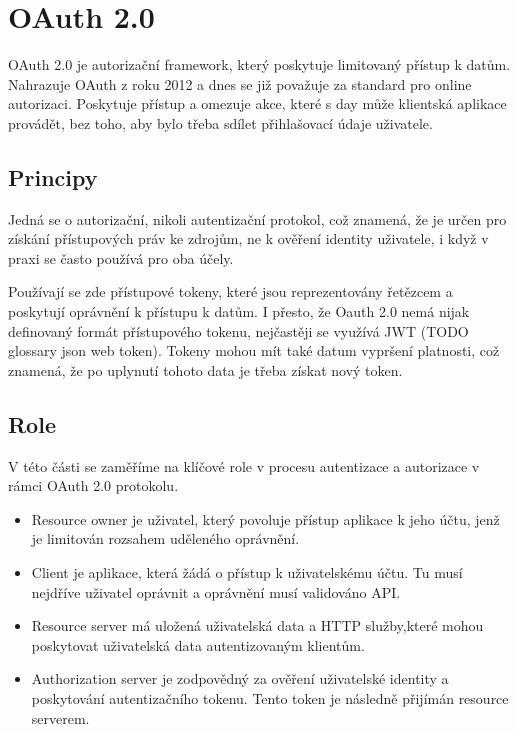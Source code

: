 \section{OAuth 2.0}
OAuth 2.0 je autorizační \gls{framework}, který poskytuje limitovaný přístup k datům. Nahrazuje OAuth z roku 2012 a dnes se již považuje za standard pro online autorizaci. Poskytuje přístup a omezuje akce, které s day může klientská aplikace provádět, bez toho, aby bylo třeba sdílet přihlašovací údaje uživatele.


\subsection{Principy}
Jedná se o autorizační, nikoli autentizační protokol, což znamená, že je určen pro získání přístupových práv ke zdrojům, ne k ověření identity uživatele, i když v praxi se často používá pro oba účely.

Používají se zde přístupové tokeny, které jsou reprezentovány řetězcem a poskytují oprávnění k přístupu k datům. I přesto, že Oauth 2.0 nemá nijak definovaný formát přístupového tokenu, nejčastěji se využívá JWT (TODO glossary json web token). Tokeny mohou mít také datum vypršení platnosti, což znamená, že po uplynutí tohoto data je třeba získat nový token.


\subsection{Role}\label{sec:Oauth_roles}
V této části se zaměříme na klíčové role v procesu autentizace a autorizace v rámci OAuth 2.0 protokolu.

\begin{itemize}
    \item Resource owner je uživatel, který povoluje přístup aplikace k jeho účtu, jenž je limitován rozsahem uděleného oprávnění.
    \item Client je aplikace, která žádá o přístup k uživatelskému účtu. Tu musí nejdříve uživatel oprávnit a oprávnění musí validováno API.
    \item Resource server má uložená uživatelská data a HTTP služby,které mohou poskytovat uživatelská data autentizovaným klientům.
    \item Authorization server je zodpovědný za ověření uživatelské identity a poskytování autentizačního tokenu. Tento token je následně přijímán resource serverem.
\end{itemize}


